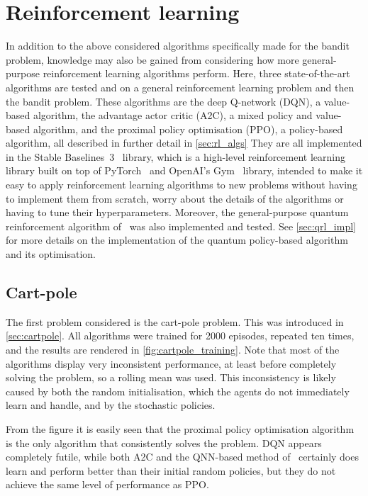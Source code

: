 \section{Reinforcement learning}
\label{sec:sim_rl}

In addition to the above considered algorithms specifically made for the bandit problem, knowledge may also be gained from considering how more general-purpose reinforcement learning algorithms perform.
Here, three state-of-the-art algorithms are tested and on a general reinforcement learning problem and then the bandit problem.
These algorithms are the deep Q-network (DQN), a value-based algorithm, the advantage actor critic (A2C), a mixed policy and value-based algorithm, and the proximal policy optimisation (PPO), a policy-based algorithm, all described in further detail in \cref{sec:rl_algs}
They are all implemented in the Stable Baselines~3~\autocite{sb3} library, which is a high-level reinforcement learning library built on top of PyTorch~\autocite{pytorch} and OpenAI's Gym~\autocite{gym} library, intended to make it easy to apply reinforcement learning algorithms to new problems without having to implement them from scratch, worry about the details of the algorithms or having to tune their hyperparameters.
Moreover, the general-purpose quantum reinforcement algorithm of~\autocite{jerbi2021} was also implemented and tested.
See \cref{sec:qrl_impl} for more details on the implementation of the quantum policy-based algorithm and its optimisation.

\subsection{Cart-pole}
\label{sec:sim_rl_cartpole}

The first problem considered is the cart-pole problem.
This was introduced in \cref{sec:cartpole}.
All algorithms were trained for 2000 episodes, repeated ten times, and the results are rendered in \cref{fig:cartpole_training}.
Note that most of the algorithms display very inconsistent performance, at least before completely solving the problem, so a rolling mean was used.
This inconsistency is likely caused by both the random initialisation, which the agents do not immediately learn and handle, and by the stochastic policies.

From the figure it is easily seen that the proximal policy optimisation algorithm is the only algorithm that consistently solves the problem.
DQN appears completely futile, while both A2C and the QNN-based method of~\autocite{jerbi2021} certainly does learn and perform better than their initial random policies, but they do not achieve the same level of performance as PPO.


